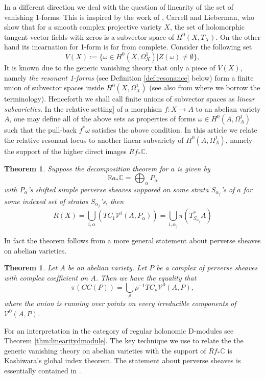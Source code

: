 \documentclass[11pt,reqno]{amsart}
\newtheorem{theorem}{Theorem}[section]
\newtheorem{alphtheorem}{Theorem}
\theoremstyle{definition}
\theoremstyle{remark}
\theoremstyle{cited}
\theoremstyle{citeddef}
\newcommand\sV{{\mathcal V}}
\newcommand{\bbC}{\mathbb{C}}
\newcommand{\bbR}{\mathbb{R}}
\begin{document}
In a different direction we deal with the question
of linearity of the set of vanishing 1-forms. This is
inspired by the work of  \cite{CL73}, Carrell and Lieberman, who show that for a smooth complex projective variety $X$, the set of holomorphic tangent vector fields with zeros is a subvector space of $H^0(X, T_X)$. On the
other hand its incarnation for 1-form is far from complete.
Consider the following set
\[V(X):=\{ \omega\in H^0(X, \Omega_X^1) | Z(\omega)\neq \emptyset\},\]
It is known due to the generic vanishing theory
that only a piece of $V(X)$, namely \emph{the resonant 1-forms} (see Definition \ref{def:resonance} below) 
form a finite union of subvector spaces inside $H^0(X, \Omega_X^1)$ \cite[Theorem 4.2]{Sim93} (see also \cite{DiPa13} from where
we borrow the terminology). 
Henceforth we shall call finite unions of subvector spaces as \emph{linear subvarieties}. In the relative setting]
of a morphism $f\colon X\to A$ to an abelian variety $A$,
one may define all of the above sets as properties
of forms $\omega\in H^0(A,\Omega_A^1)$ such that the pull-back
$f^*\omega$ satisfies the above condition.
In this article we relate the relative resonant locus to another linear subvariety of $H^0(A, \Omega_A^1)$, namely the
support of the higher direct images $Rf_*\bbC$. 
\begin{alphtheorem}
Suppose the decomposition theorem
for $a$ is given by
\[\bbR a_*\bbC = \bigoplus_{\alpha}P_{\alpha}\]
with $P_{\alpha}$'s shifted simple perverse sheaves suppored on some strata $S_{\alpha_j}$'s of $a$ for some indexed set of stratas $S_{\alpha_j}$'s, then
\[R(X) = \bigcup_{i,\alpha} (TC_1 \sV^i(A, P_{\alpha})) = \bigcup_{i,\alpha_j}\pi(T^*_{S_{\alpha_j}}A) \]
\label{thm:linearity}
\end{alphtheorem}
In fact the theorem follows from a more general statement
about perverse sheaves on abelian varieties.
\begin{theorem}
Let $A$ be an abelian variety. Let $P$ be a complex of perverse sheaves with complex coefficient on $A$. 
Then we have the equality that
$$\pi(CC(P)) = \bigcup_{\rho} \rho^{-1} TC_{\rho} \sV^0(A,P), $$
where the union is running over points on every irreducible components of $\sV^0(A,P)$.  
\label{thm:perverse}
\end{theorem}
For an
interpretation in the category of regular holonomic D-modules
see Theorem \ref{thm:linearitydmodule}. The key technique we
use to relate the the generic vanishing theory on abelian varieties with the support of $Rf_*\bbC$ is Kashiwara's
global index theorem. The statement about perverse sheaves
is essentially contained in \cite{sch}.
\end{document}
